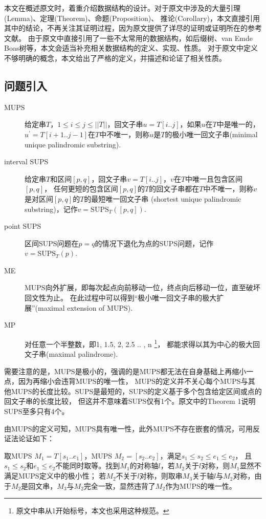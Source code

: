 
本文在概述原文时，着重介绍数据结构的设计。对于原文中涉及的大量引理(Lemma)、定理(Theorem)、命题(Proposition)、
推论(Corollary)，本文直接引用其中的结论，不再关注其证明过程，因为原文提供了详尽的证明或证明所在的参考文献。
由于原文中直接引用了一些不太常用的数据结构，如后缀树、van Emde Boas树等，本文会适当补充相关数据结构的定义、实现、性质。
对于原文中定义不够明确的概念，本文给出了严格的定义，并描述和论证了相关性质。

\subsection{问题引入}\label{subsec:intro}

\begin{description}
    \item[MUPS] 给定串$T$，$1 \leq i \leq j \leq ||T||$，回文子串$u = T[i..j]$，如果$u$在$T$中是唯一的，
    $u^{\prime} = T[i + 1..j - 1]$在$T$中不唯一，则称$u$是$T$的极小唯一回文子串(minimal unique palindromic substring).
    \item[interval SUPS] 给定串$T$和区间$[p,q]$，回文子串$v = T[i..j]$，$v$在$T$中唯一且包含区间$[p,q]$，
    任何更短的包含区间$[p,q]$的$T$的回文子串都在$T$中不唯一，则称$v$是对区间$[p,q]$的$T$的最短唯一回文子串
    (shortest unique palindromic substring)，记作$v = \mathrm{SUPS}_T ([p,q])$.
    \item[point SUPS] 区间SUPS问题在$p = q$的情况下退化为点的SUPS问题，记作$v = \mathrm{SUPS}_T (p)$.
    \item[ME] MUPS向外扩展，即每次起点向前移动一位，终点向后移动一位，直至破坏回文性为止。
    在此过程中可以得到“极小唯一回文子串的极大扩展”(maximal extension of MUPS).
    \item[MP] 对任意一个半整数，即1, 1.5, 2, 2.5 .. , n \footnote{原文中串从1开始标号，本文也采用这种规范。}，
    都能求得以其为中心的极大回文子串(maximal palindrome).
\end{description}

需要注意的是，MUPS是极小的，强调的是MUPS都无法在自身基础上再缩小一点，因为再缩小会违背MUPS的唯一性，
MUPS的定义并不关心每个MUPS与其他MUPS的长度比较。SUPS是最短的，SUPS的定义基于多个包含给定区间或点的回文子串的长度比较，
但这并不意味着SUPS仅有1个。原文中的Theorem 1说明SUPS至多只有4个。

由MUPS的定义可知，MUPS具有唯一性，此外MUPS不存在嵌套的情况，可用反证法论证如下：

取MUPS $M_1 = T[s_1..e_1]$，MUPS $M_2 = [s_2..e_2]$，满足$s_1 \leq s_2 \leq e_1 \leq e_2 $，
且$s_1 \leq s_2$和$e_1 \leq e_2$不能同时取等。找到$M_1$的对称轴$l$，若$M_2$关于$l$对称，则$M_1$显然不满足MUPS定义中的极小性；
若$M_2$不关于$l$对称，则取串$M_3$关于轴$l$与$M_2$对称，由于$M_2$是回文串，$M_3$与$M_2$完全一致，显然违背了$M_2$作为MUPS的唯一性。


